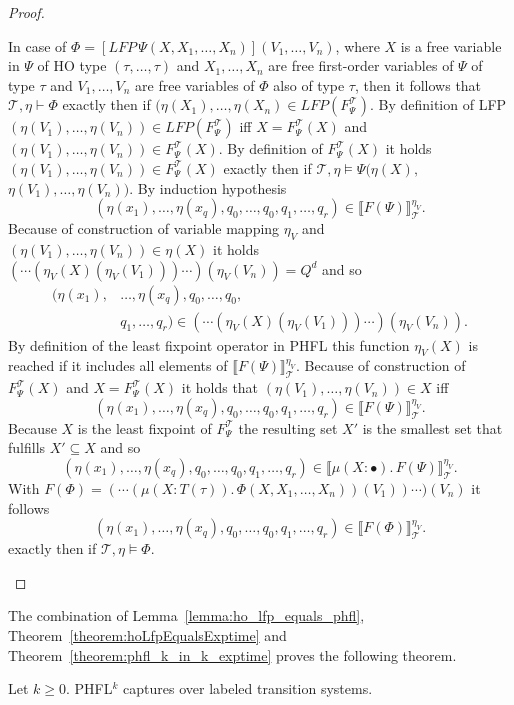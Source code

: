 \begin{proof}
\begin{compactitem}
        \item In case of $\Phi = [LFP\,\Psi(X, X_1, \dots, X_n)](V_1, \dots, V_n)$, where $X$ is a
        free variable in $\Psi$ of HO type $(\tau, \dots, \tau)$ and $X_1, \dots, X_n$ are free first-order
        variables of $\Psi$ of type $\tau$ and $V_1, \dots, V_n$ are free variables of $\Phi$ also of type $\tau$, then
        it follows that $\mathcal{T}, \eta \vdash \Phi$ exactly then if $(\eta(X_1), \dots, \eta(X_n) \in LFP
        (F_\Psi^\mathcal{T})$. By definition of LFP $(\eta(V_1), \dots, \eta(V_n)) \in
        LFP(F_\Psi^\mathcal{T})$ iff $X = F_\Psi^\mathcal{T}(X)$ and $(\eta(V_1), \dots, \eta(V_n)) \in
        F_\Psi^\mathcal{T}(X)$. By definition of $F_\Psi^\mathcal{T}(X)$ it holds $(\eta
        (V_1), \dots, \eta(V_n)) \in F_\Psi^\mathcal{T}(X)$ exactly then if $\mathcal{T}, \eta \models \Psi
        (\eta(X), $ $\eta(V_1), \dots, \eta(V_n))$. By induction hypothesis
        \[(\eta(x_1), \dots, \eta(x_q), q_0, \dots, q_0, q_1, \dots, q_r) \in \llbracket  F(\Psi)
        \rrbracket^{\eta_V}_\mathcal{T}.\]
        Because of construction of variable mapping $\eta_V$ and $(\eta(V_1), \dots, \eta(V_n)) \in \eta(X)$ it holds
        $(\dotsb(\eta_V(X)(\eta_V(V_1))) \dotsb )(\eta_V(V_n)) = Q^d$
        and so 
        \begin{align*}
        (\eta(x_1),& \dots, \eta(x_q), q_0, \dots, q_0, \\&q_1, \dots, q_r) \in (\dotsb (\eta_V(X)(\eta_V(V_1))) \dotsb )(\eta_V(V_n)).\end{align*} By definition of the least fixpoint operator in PHFL this function
        $\eta_V(X)$ is reached if it includes all
        elements of $\llbracket  F(\Psi) \rrbracket^{\eta_V}_\mathcal{T}$. Because of
        construction of $F_\Psi^\mathcal{T}(X)$ and $X = F_\Psi^\mathcal{T}(X)$ it holds that $(\eta(V_{1}),
        \dots, \eta(V_{n})) \in X$ iff
        \[(\eta(x_1), \dots, \eta(x_q), q_0, \dots, q_0, q_1, \dots, q_r) \in \llbracket
         F(\Psi) \rrbracket^{\eta_V}_\mathcal{T}.\]
        Because $X$ is the least fixpoint of $F_\Psi^\mathcal{T}$ the resulting set $X'$ is the smallest set that
        fulfills $X' \subseteq X$ and so
        \[(\eta(x_{1}), \dots, \eta(x_q), q_0, \dots, q_0, q_1, \dots, q_r) \in \llbracket
         \mu(X\colon \bullet).\,F(\Psi) \rrbracket^{\eta_V}_\mathcal{T}.\]
        With $F(\Phi) = (\dotsb (\mu (X \colon T(\tau)).\,\Phi(X, X_1, \dots, X_n))(V_1))\dotsb)(V_n)$ it follows
        \[(\eta(x_{1}), \dots, \eta(x_q), q_0, \dots, q_0, q_1, \dots, q_r) \in \llbracket
         F(\Phi) \rrbracket^{\eta_V}_\mathcal{T}.\]
        exactly then if $\mathcal{T}, \eta \models \Phi$.
    \end{compactitem}
\end{proof}

The combination of Lemma~\ref{lemma:ho_lfp_equals_phfl}, Theorem~\ref{theorem:hoLfpEqualsExptime} and
Theorem~\ref{theorem:phfl_k_in_k_exptime} proves the following theorem.

\begin{theorem}
    Let $k \geq 0$. PHFL$^k$ captures  over labeled transition systems.
\end{theorem}


